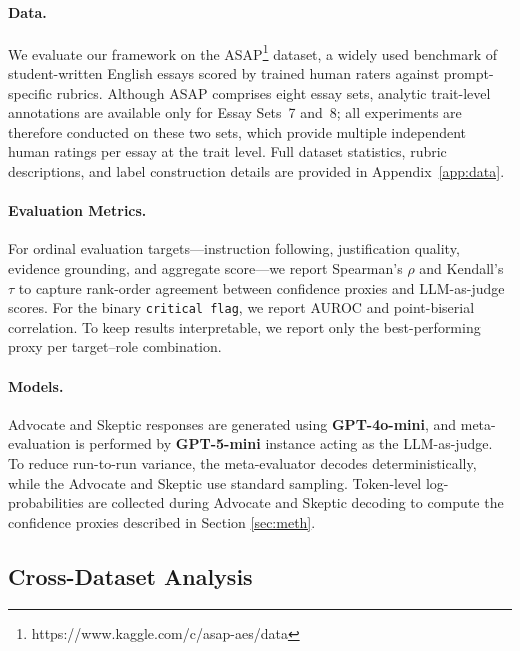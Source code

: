 \documentclass[11pt]{article}
\begin{document}
\paragraph{Data.} We evaluate our framework on the ASAP\footnote{https://www.kaggle.com/c/asap-aes/data} dataset, a widely used benchmark of student-written English essays scored by trained human raters against prompt-specific rubrics. Although ASAP comprises eight essay sets, analytic trait-level annotations are available only for Essay Sets~7 and~8; all experiments are therefore conducted on these two sets, which provide multiple independent human ratings per essay at the trait level. Full dataset statistics, rubric descriptions, and label construction details are provided in Appendix~\ref{app:data}.

\paragraph{Evaluation Metrics.} For ordinal evaluation targets—instruction following, justification quality, evidence grounding, and aggregate score—we report Spearman's $\rho$ and Kendall's $\tau$ to capture rank-order agreement between confidence proxies and LLM-as-judge scores. For the binary \texttt{critical flag}, we report AUROC and point-biserial correlation. To keep results interpretable, we report only the best-performing proxy per target–role combination.

\paragraph{Models.} Advocate and Skeptic responses are generated using \textbf{GPT-4o-mini}, and meta-evaluation is performed by \textbf{GPT-5-mini} instance acting as the LLM-as-judge. To reduce run-to-run variance, the meta-evaluator decodes deterministically, while the Advocate and Skeptic use standard sampling. Token-level log-probabilities are collected during Advocate and Skeptic decoding to compute the confidence proxies described in Section \ref{sec:meth}.



\subsection{Cross-Dataset Analysis}
\end{document}
